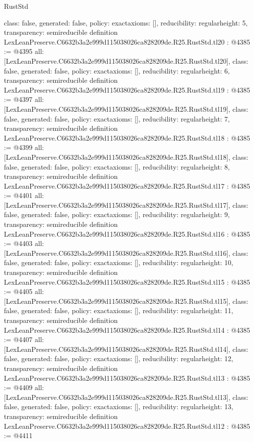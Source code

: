 \begin{lexlean}{RustStd}
\begin{coremodule}
{  class: false,
  generated: false,
  policy: exact{axioms: []},
  reducibility: regular{height: 5},
  transparency: semireducible
}
definition LexLeanPreserve.C6632b3a2e999d115038026ca828209de.R25.RustStd.tl20 : @4385 := @4395 {
  all: [LexLeanPreserve.C6632b3a2e999d115038026ca828209de.R25.RustStd.tl20],
  class: false,
  generated: false,
  policy: exact{axioms: []},
  reducibility: regular{height: 6},
  transparency: semireducible
}
definition LexLeanPreserve.C6632b3a2e999d115038026ca828209de.R25.RustStd.tl19 : @4385 := @4397 {
  all: [LexLeanPreserve.C6632b3a2e999d115038026ca828209de.R25.RustStd.tl19],
  class: false,
  generated: false,
  policy: exact{axioms: []},
  reducibility: regular{height: 7},
  transparency: semireducible
}
definition LexLeanPreserve.C6632b3a2e999d115038026ca828209de.R25.RustStd.tl18 : @4385 := @4399 {
  all: [LexLeanPreserve.C6632b3a2e999d115038026ca828209de.R25.RustStd.tl18],
  class: false,
  generated: false,
  policy: exact{axioms: []},
  reducibility: regular{height: 8},
  transparency: semireducible
}
definition LexLeanPreserve.C6632b3a2e999d115038026ca828209de.R25.RustStd.tl17 : @4385 := @4401 {
  all: [LexLeanPreserve.C6632b3a2e999d115038026ca828209de.R25.RustStd.tl17],
  class: false,
  generated: false,
  policy: exact{axioms: []},
  reducibility: regular{height: 9},
  transparency: semireducible
}
definition LexLeanPreserve.C6632b3a2e999d115038026ca828209de.R25.RustStd.tl16 : @4385 := @4403 {
  all: [LexLeanPreserve.C6632b3a2e999d115038026ca828209de.R25.RustStd.tl16],
  class: false,
  generated: false,
  policy: exact{axioms: []},
  reducibility: regular{height: 10},
  transparency: semireducible
}
definition LexLeanPreserve.C6632b3a2e999d115038026ca828209de.R25.RustStd.tl15 : @4385 := @4405 {
  all: [LexLeanPreserve.C6632b3a2e999d115038026ca828209de.R25.RustStd.tl15],
  class: false,
  generated: false,
  policy: exact{axioms: []},
  reducibility: regular{height: 11},
  transparency: semireducible
}
definition LexLeanPreserve.C6632b3a2e999d115038026ca828209de.R25.RustStd.tl14 : @4385 := @4407 {
  all: [LexLeanPreserve.C6632b3a2e999d115038026ca828209de.R25.RustStd.tl14],
  class: false,
  generated: false,
  policy: exact{axioms: []},
  reducibility: regular{height: 12},
  transparency: semireducible
}
definition LexLeanPreserve.C6632b3a2e999d115038026ca828209de.R25.RustStd.tl13 : @4385 := @4409 {
  all: [LexLeanPreserve.C6632b3a2e999d115038026ca828209de.R25.RustStd.tl13],
  class: false,
  generated: false,
  policy: exact{axioms: []},
  reducibility: regular{height: 13},
  transparency: semireducible
}
definition LexLeanPreserve.C6632b3a2e999d115038026ca828209de.R25.RustStd.tl12 : @4385 := @4411 {
}
\end{coremodule}
\end{lexlean}

